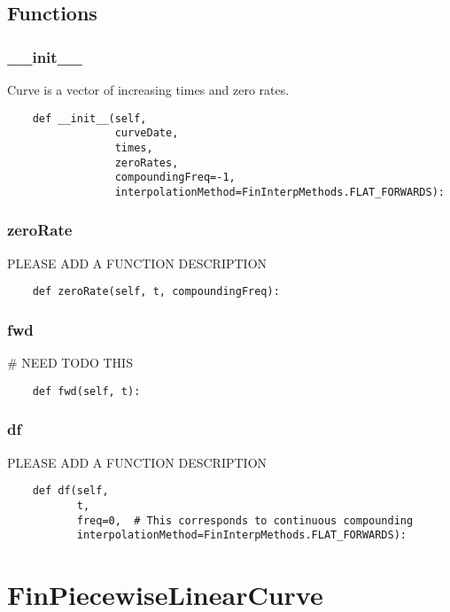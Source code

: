 \documentclass[twoside,11pt]{book}
\begin{document}
\subsection*{Functions}

\subsubsection*{{\bf \_\_init\_\_}}
Curve is a vector of increasing times and zero rates.  

\begin{lstlisting}
    def __init__(self,
                 curveDate,
                 times,
                 zeroRates,
                 compoundingFreq=-1,
                 interpolationMethod=FinInterpMethods.FLAT_FORWARDS):
\end{lstlisting}

\subsubsection*{{\bf zeroRate}}
PLEASE ADD A FUNCTION DESCRIPTION

\begin{lstlisting}
    def zeroRate(self, t, compoundingFreq):
\end{lstlisting}

\subsubsection*{{\bf fwd}}
\# NEED TODO THIS 

\begin{lstlisting}
    def fwd(self, t):
\end{lstlisting}

\subsubsection*{{\bf df}}
PLEASE ADD A FUNCTION DESCRIPTION

\begin{lstlisting}
    def df(self,
           t,
           freq=0,  # This corresponds to continuous compounding
           interpolationMethod=FinInterpMethods.FLAT_FORWARDS):
\end{lstlisting}

\newpage
\section{FinPiecewiseLinearCurve}
\end{document}
